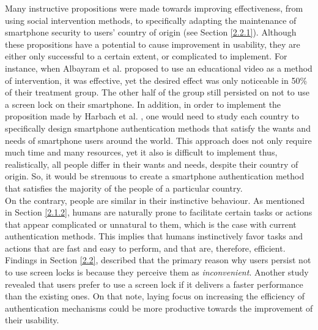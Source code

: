 Many instructive propositions were made towards improving effectiveness, from using social intervention methods, to specifically adapting the maintenance of smartphone security to users' country of origin (see Section \ref{2.2.1}). Although these propositions have a potential to cause improvement in usability, they are either only successful to a certain extent, or complicated to implement. For instance, when Albayram et al. \cite{Albayram:2017:BUL:3235924.3235929} proposed to use an educational video as a method of intervention, it was effective, yet the desired effect was only noticeable in 50\% of their treatment group. The other half of the group still persisted on not to use a screen lock on their smartphone. In addition, in order to implement the proposition made by Harbach et al. \cite{Harbach:2016}, one would need to study each country to specifically design smartphone authentication methods that satisfy the wants and needs of smartphone users around the world. This approach does not only require much time and many resources, yet it also is difficult to implement thus, realistically, all people differ in their wants and needs, despite their country of origin. So, it would be strenuous to create a smartphone authentication method that satisfies the majority of the people of a particular country. \\

On the contrary, people are similar in their instinctive behaviour. As mentioned in Section \ref{2.1.2}, humans are naturally prone to facilitate certain tasks or actions that appear complicated or unnatural to them, which is the case with current authentication methods. This implies that humans instinctively favor tasks and actions that are fast and easy to perform, and that are, therefore, efficient. Findings in Section \ref{2.2}, described that the primary reason why users persist not to use screen locks is because they perceive them as \textit{inconvenient}. Another study revealed that users prefer to use a screen lock if it delivers a faster performance than the existing ones. On that note, laying focus on increasing the efficiency of authentication mechanisms could be more productive towards the improvement of their usability. \\

